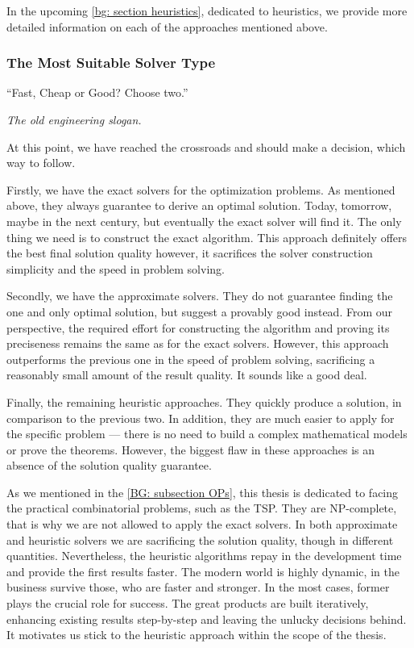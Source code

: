 In the upcoming \cref{bg: section heuristics}, dedicated to heuristics, we provide more detailed information on each of the approaches mentioned above.


\subsubsection{The Most Suitable Solver Type}
\epigraph{``Fast, Cheap or Good? Choose two.''}{\textit{The old engineering slogan.}}

At this point, we have reached the crossroads and should make a decision, which way to follow.

Firstly, we have the exact solvers for the optimization problems. As mentioned above, they always guarantee to derive an optimal solution. Today, tomorrow, maybe in the next century, but eventually the exact solver will find it. The only thing we need is to construct the exact algorithm. This approach definitely offers the best final solution quality however, it sacrifices the solver construction simplicity and the speed in problem solving.

Secondly, we have the approximate solvers. They do not guarantee finding the one and only optimal solution, but suggest a provably good instead. From our perspective, the required effort for constructing the algorithm and proving its preciseness remains the same as for the exact solvers. However, this approach outperforms the previous one in the speed of problem solving, sacrificing a reasonably small amount of the result quality. It sounds like a good deal.

Finally, the remaining heuristic approaches. They quickly produce a solution, in comparison to the previous two. In addition, they are much easier to apply for the specific problem — there is no need to build a complex mathematical models or prove the theorems. However, the biggest flaw in these approaches is an absence of the solution quality guarantee.

As we mentioned in the \cref{BG: subsection OPs}, this thesis is dedicated to facing the practical combinatorial problems, such as the TSP. They are NP-complete, that is why we are not allowed to apply the exact solvers. In both approximate and heuristic solvers we are sacrificing the solution quality, though in different quantities. Nevertheless, the heuristic algorithms repay in the development time and provide the first results faster. The modern world is highly dynamic, in the business survive those, who are faster and stronger. In the most cases, former plays the crucial role for success. The great products are built iteratively, enhancing existing results step-by-step and leaving the unlucky decisions behind. It motivates us stick to the heuristic approach within the scope of the thesis.

